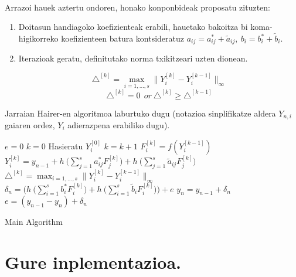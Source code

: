 \paragraph*{}Arrazoi hauek aztertu ondoren, honako konponbideak proposatu zituzten:

\begin{enumerate}
\item Doitasun handiagoko koefizienteak erabili, hauetako bakoitza bi koma-higikorreko koefizienteen batura kontsideratuz $a_{ij}= a^{\ast}_{ij}+\tilde a_{ij}, \ b_i= b^{\ast}_i+\tilde b_i$.
\item Iterazioak geratu, definitutako norma txikitzeari uzten dionean.

\[\triangle ^{[k]} = \max_{i=1,\dots,s}\|Y_i^{[k]}-Y_i^{[k-1]}\|_{\infty} \]
\begin{equation*}
\triangle^{[k]} = 0 \ \ or \  \triangle^{[k]} \geqslant \triangle^{[k-1]}
\end{equation*}
  	 	
\end{enumerate}

Jarraian Hairer-en algoritmoa laburtuko dugu  (notazioa sinplifikatze aldera $Y_{n,i}$ gaiaren ordez, $Y_i$ adierazpena erabiliko dugu).

\begin{algorithm}[h]
 \BlankLine
  $e=0$\;
  {
   \BlankLine
   $k=0$\;
   Hasieratu  $Y_{i}^{[0]}$\; 
   \BlankLine
   {
    \BlankLine 
    $k=k+1$\;
    $F_{i}^{[k]}=f(Y_{i}^{[k-1]}) $\;
    $Y_{i}^{[k]}=y_{n-1}+ h \ \big(\sum\limits_{j=1}^{s} a^{\ast}_{ij} F_{j}^{[k]} \big) 
                          + h \ \big(\sum\limits_{j=1}^{s} \tilde a_{ij} F_{j}^{[k]} \big)$\; 
    $\triangle ^{[k]} = \max_{i=1,\dots,s}\|Y_{i}^{[k]}-Y_{i}^{[k-1]}\|_{\infty}$\;
   }
   \BlankLine
    $\delta_{n}= \bigg(h \ \big(\sum\limits_{i=1}^{s} b^{\ast}_i F_{i}^{[k]} \big)
               + h \ \big(\sum\limits_{i=1}^{s} \tilde b_i F_{i}^{[k]} \big) \bigg)+e $\;
    $y_n=y_{n-1}+\delta_n$\;
    $e=(y_{n-1}-y_n)+\delta_n$\;            
   \BlankLine
 }
 \caption{Main Algorithm}
\end{algorithm}


\section{Gure inplementazioa.}

